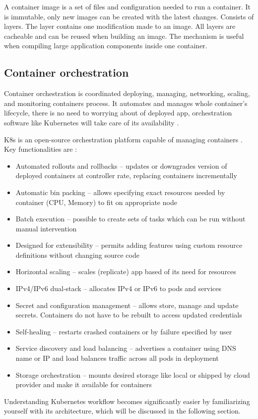 A container image is a set of files and configuration needed to run a container. It is immutable, only new images can be created with the latest changes. Consists of layers. The layer contains one modification made to an image. All layers are cacheable and can be reused when building an image. The mechanism is useful when compiling large application components inside one container\cite{DockerImage}. 


\subsection{Container orchestration}
\label{sec:ContainerOrchestration}

Container orchestration is coordinated deploying, managing, networking, scaling, and monitoring containers process. It automates and manages whole container's lifecycle, there is no need to worrying about of deployed app, orchestration software like Kubernetes will take care of its availability \cite{RedhatContainerization}.

K8s is an open-source orchestration platform capable of managing containers \cite{KubernetesDocs}. Key functionalities are \cite{KubernetesDocs}:

\begin{itemize}
    \item Automated rollouts and rollbacks -- updates or downgrades version of deployed containers at controller rate, replacing containers incrementally
    \item Automatic bin packing --  allows specifying exact resources needed by container (CPU, Memory) to fit on appropriate node
    \item Batch execution -- possible to create sets of tasks which can be run without manual intervention
    \item Designed for extensibility -- permits adding features using custom resource definitions without changing source code
    \item Horizontal scaling -- scales (replicate) app based of its need for resources
    \item IPv4/IPv6 dual-stack -- allocates IPv4 or IPv6 to pods and services
    \item Secret and configuration management -- allows store, manage and update secrets. Containers do not have to be rebuilt to access updated  credentials
    \item Self-healing -- restarts crashed containers or by failure specified by user
    \item Service discovery and load balancing -- advertises a container using DNS name or IP and load balances traffic across all pods in deployment
    \item Storage orchestration -- mounts desired storage like local or shipped by cloud provider and make it available for containers
\end{itemize}
Understanding Kubernetes workflow becomes significantly easier by familiarizing yourself with its architecture, which will be discussed in the following section.


